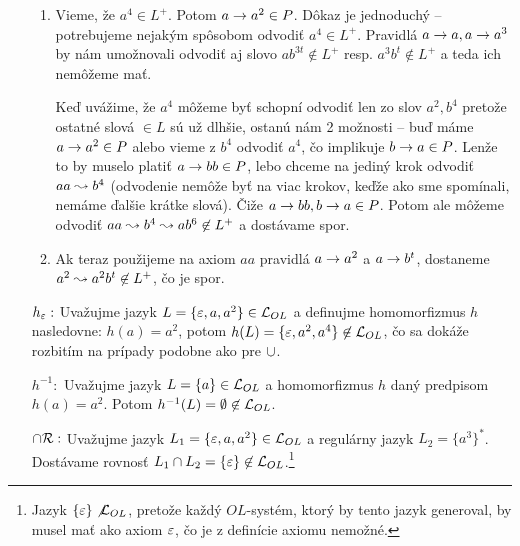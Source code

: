 \begin{dokaz}
\begin{itemize}
\begin{enumerate}
        \item Vieme, že $a^4 \in L^{+}$. Potom $a\rightarrow a^2 \in P$.
            Dôkaz je jednoduchý
            -- potrebujeme nejakým spôsobom odvodiť $a^4 \in L^{+}$.
            Pravidlá $a\rightarrow a,a\rightarrow a^3$ by nám
            umožnovali odvodiť aj slovo $ab^{3t}\not\in L^{+}$
            resp. $a^3b^t \not \in L^{+}$ a teda ich nemôžeme mať.
           
            Keď uvážime, že $a^4$ môžeme byť schopní odvodiť len zo
            slov $a^2, b^4$ pretože ostatné slová $\in L$ sú už
            dlhšie, ostanú nám 2 možnosti -- buď máme
            $a \rightarrow a^2 \in P$ alebo vieme z $b^4$ odvodiť $a^4$,
            čo implikuje $b \rightarrow a \in P$. Lenže to by muselo
            platiť $a \rightarrow bb \in P$, lebo chceme na jediný krok
            odvodiť $aa \leadsto b^4$ (odvodenie nemôže byť na viac
            krokov, keďže ako sme spomínali, nemáme ďalšie krátke
            slová).
            Čiže $a \rightarrow bb, b \rightarrow a \in P$.
            Potom ale môžeme odvodiť $aa \leadsto b^4 \leadsto
              ab^6 \not \in L^{+}$ a dostávame spor.

        \item Ak teraz použijeme na axiom $aa$ pravidlá 
            $a\rightarrow a^2$ a $a\rightarrow b^{t}$, dostaneme 
            $a^2 \leadsto a^2 b^t \not\in L^{+}$, čo je spor.
        \end{enumerate}

    \item[$h_{\varepsilon}:$] Uvažujme jazyk
        $L=\{\varepsilon,a,a^2\}\in \mathcal{L}_{OL}$ a definujme
        homomorfizmus $h$ nasledovne: $h(a)=a^2$, potom
        $h(L)=\{\varepsilon,a^2,a^4\} \not \in \mathcal{L}_{OL}$, čo sa
        dokáže rozbitím na prípady podobne ako pre $\cup$.

    \item[$h^{-1}:$] Uvažujme jazyk $L=\{a\}\in \mathcal{L}_{OL}$ a
        homomorfizmus $h$ daný predpisom $h(a)=a^2$. Potom
        $h^{-1}(L)=\emptyset \not\in \mathcal{L}_{OL}$.

    \item[$\cap \mathcal{R} :$] Uvažujme jazyk
        $L_1=\{\varepsilon,a,a^2\} \in \mathcal{L}_{OL}$ a regulárny
        jazyk $L_2=\{a^3\}^{*}$.
        Dostávame rovnosť $L_1 \cap
        L_2 =\{\varepsilon\}\not\in \mathcal{L}_{OL}$.\footnote{
            Jazyk $\{\varepsilon\}\not \mathcal{L}_{OL}$, pretože každý
            $OL$-systém, ktorý by tento jazyk generoval, by musel mať ako
            axiom $\varepsilon$, čo je z definície axiomu nemožné.
        }
    \end{itemize}
\end{dokaz}


